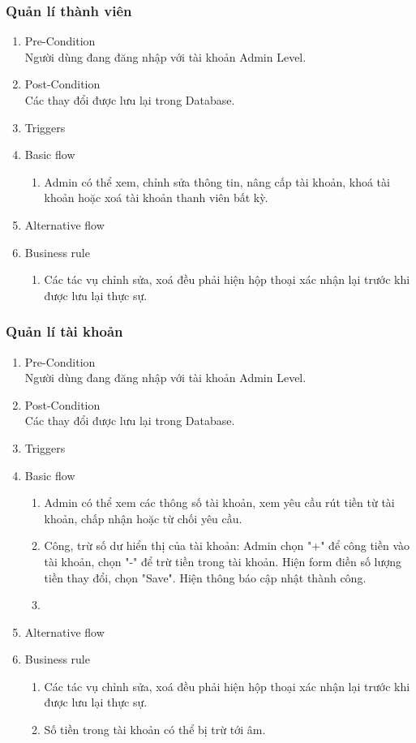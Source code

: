 \subsubsection{Quản lí thành viên}
\begin{enumerate}
	\item Pre-Condition\\
	Người dùng đang đăng nhập với tài khoản Admin Level.
	\item Post-Condition\\
	Các thay đổi được lưu lại trong Database.
	\item Triggers
	\item Basic flow
	\begin{enumerate}
		\item Admin có thể xem, chỉnh sửa thông tin, nâng cấp tài khoản, khoá tài khoản hoặc xoá tài khoản thanh viên bất kỳ.
	\end{enumerate}
	\item Alternative flow
	\item Business rule
	\begin{enumerate}
		\item Các tác vụ chỉnh sửa, xoá đều phải hiện hộp thoại xác nhận lại trước khi được lưu lại thực sự.
	\end{enumerate}
\end{enumerate}

\subsubsection{Quản lí tài khoản}
\begin{enumerate}
	\item Pre-Condition\\
	Người dùng đang đăng nhập với tài khoản Admin Level.
	\item Post-Condition\\
	Các thay đổi được lưu lại trong Database.
	\item Triggers
	\item Basic flow
	\begin{enumerate}
		\item Admin có thể xem các thông số tài khoản, xem yêu cầu rút tiền từ tài khoản, chấp nhận hoặc từ chối yêu cầu.
		\item Công, trừ số dư hiển thị của tài khoản: Admin chọn "+" để công tiền vào tài khoản, chọn "-" để trừ tiền trong tài khoản. Hiện form điền số lượng tiền thay đổi, chọn "Save". Hiện thông báo cập nhật thành công.
		\item 
	\end{enumerate}
	\item Alternative flow
	\item Business rule
	\begin{enumerate}
		\item Các tác vụ chỉnh sửa, xoá đều phải hiện hộp thoại xác nhận lại trước khi được lưu lại thực sự.
		\item Số tiền trong tài khoản có thể bị trừ tới âm.
	\end{enumerate}
\end{enumerate}


